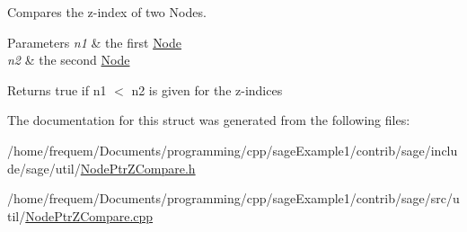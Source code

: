 Compares the z-\/index of two Nodes. 


\begin{DoxyParams}{Parameters}
{\em n1} & the first \mbox{\hyperlink{classsage_1_1Node}{Node}} \\
\hline
{\em n2} & the second \mbox{\hyperlink{classsage_1_1Node}{Node}} \\
\hline
\end{DoxyParams}
\begin{DoxyReturn}{Returns}
true if n1 $<$ n2 is given for the z-\/indices 
\end{DoxyReturn}


The documentation for this struct was generated from the following files\+:\begin{DoxyCompactItemize}
\item 
/home/frequem/\+Documents/programming/cpp/sage\+Example1/contrib/sage/include/sage/util/\mbox{\hyperlink{NodePtrZCompare_8h}{Node\+Ptr\+Z\+Compare.\+h}}\item 
/home/frequem/\+Documents/programming/cpp/sage\+Example1/contrib/sage/src/util/\mbox{\hyperlink{NodePtrZCompare_8cpp}{Node\+Ptr\+Z\+Compare.\+cpp}}\end{DoxyCompactItemize}
